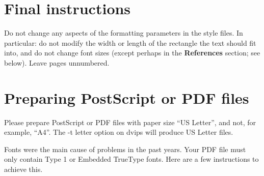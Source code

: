 \documentclass{article}
\theoremstyle{plain}
\begin{document}
\section{Final instructions}
Do not change any aspects of the formatting parameters in the style files. In
particular: do not modify the width or length of the rectangle the text should
fit into, and do not change font sizes (except perhaps in the
\textbf{References} section; see below). Leave pages unnumbered.

\section{Preparing PostScript or PDF files}

Please prepare PostScript or PDF files with paper size ``US Letter'', and
not, for example, ``A4''. The -t
letter option on dvips will produce US Letter files.

Fonts were the main cause of problems in the past years. Your PDF file must
only contain Type 1 or Embedded TrueType fonts. Here are a few instructions
to achieve this.
\end{document}
